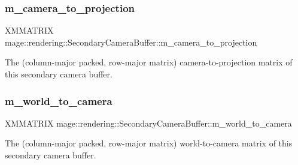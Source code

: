 \subsubsection{\texorpdfstring{m\+\_\+camera\+\_\+to\+\_\+projection}{m\_camera\_to\_projection}}
{\footnotesize\ttfamily X\+M\+M\+A\+T\+R\+IX mage\+::rendering\+::\+Secondary\+Camera\+Buffer\+::m\+\_\+camera\+\_\+to\+\_\+projection}

The (column-\/major packed, row-\/major matrix) camera-\/to-\/projection matrix of this secondary camera buffer. \mbox{\label{structmage_1_1rendering_1_1_secondary_camera_buffer_a3f131146f9374058ace582bfae3e90b7}} 
\subsubsection{\texorpdfstring{m\+\_\+world\+\_\+to\+\_\+camera}{m\_world\_to\_camera}}
{\footnotesize\ttfamily X\+M\+M\+A\+T\+R\+IX mage\+::rendering\+::\+Secondary\+Camera\+Buffer\+::m\+\_\+world\+\_\+to\+\_\+camera}

The (column-\/major packed, row-\/major matrix) world-\/to-\/camera matrix of this secondary camera buffer. 